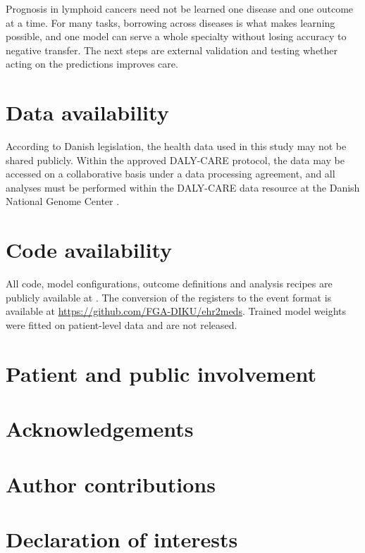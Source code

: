 Prognosis in lymphoid cancers need not be learned one disease and one outcome at
a time. For many tasks, borrowing across diseases is what makes learning
possible, and one model can serve a whole specialty without losing accuracy to
negative transfer.  The next steps
are external validation and testing whether acting on the predictions improves
care.

\section*{Data availability}
According to Danish legislation, the health data used in this study may not be
shared publicly. Within the approved DALY-CARE protocol, the data may be
accessed on a collaborative basis under a data processing agreement, and all
analyses must be performed within the DALY-CARE data resource at the Danish
National Genome Center \citep{brieghel2025dalycare}.
\section*{Code availability}
All code, model configurations, outcome definitions and analysis recipes are
publicly available at . The
conversion of the registers to the event format is available at
\url{https://github.com/FGA-DIKU/ehr2meds}. Trained model weights were fitted on
patient-level data and are not released.
\section*{Patient and public involvement}
\section*{Acknowledgements}
\section*{Author contributions}
\section*{Declaration of interests}
